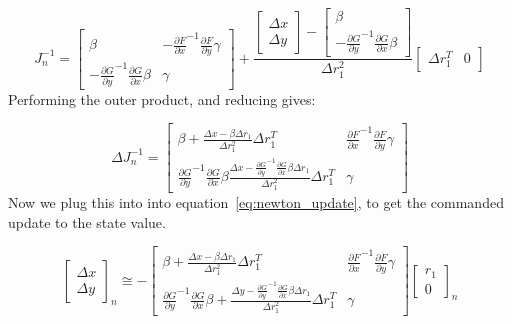 \documentclass{article}
\begin{document}
\begin{equation}
  J_n^{-1} =
  \begin{bmatrix}
    \beta &
    - {\frac{\partial F}{\partial x}}^{-1} \frac{\partial F}{\partial y} \gamma \\
    - {\frac{\partial G}{\partial y}}^{-1} \frac{\partial G}{\partial x} \beta &
    \gamma
  \end{bmatrix}
  +
  \frac{
  \begin{bmatrix}
    \Delta x \\
    \Delta y
  \end{bmatrix}
   -
  \begin{bmatrix}
    \beta \\
    - {\frac{\partial G}{\partial y}}^{-1} \frac{\partial G}{\partial x} \beta
  \end{bmatrix}
  }{\Delta r_{1}^2}
  \begin{bmatrix}
    \Delta r_{1}^T &
    0
  \end{bmatrix}
\end{equation}
Performing the outer product, and reducing gives:

\begin{equation}
  \Delta J_n^{-1} =
  \begin{bmatrix}
    \beta + \frac{\Delta x - \beta \Delta r_{1}}{\Delta r_{1}^2 } \Delta r_{1}^T &
    {\frac{\partial F}{\partial x}}^{-1} \frac{\partial F}{\partial y} \gamma \\
    {\frac{\partial G}{\partial y}}^{-1} \frac{\partial G}{\partial x} \beta \frac{\Delta x - {\frac{\partial G}{\partial y}}^{-1} \frac{\partial G}{\partial x} \beta \Delta r_{1}}{\Delta r_{1}^2 } \Delta r_{1}^T  &
    \gamma
  \end{bmatrix}
\end{equation}
Now we plug this into into equation~\eqref{eq:newton_update}, to get the commanded update to the state value.

\begin{equation}
  {
  \begin{bmatrix}
    \Delta x \\
    \Delta y
  \end{bmatrix}
  }_n \cong -
  \begin{bmatrix}
    \beta + \frac{\Delta x - \beta \Delta r_{1}}{\Delta r_{1}^2 } \Delta r_{1}^T &
    {\frac{\partial F}{\partial x}}^{-1} \frac{\partial F}{\partial y} \gamma \\
    {\frac{\partial G}{\partial y}}^{-1} \frac{\partial G}{\partial x} \beta + \frac{\Delta y - {\frac{\partial G}{\partial y}}^{-1} \frac{\partial G}{\partial x} \beta \Delta r_{1}}{\Delta r_{1}^2 } \Delta r_{1}^T  &
    \gamma
  \end{bmatrix}
  {
  \begin{bmatrix}
    r_1 \\
    0
  \end{bmatrix}
  }_n
\end{equation}
\end{document}
